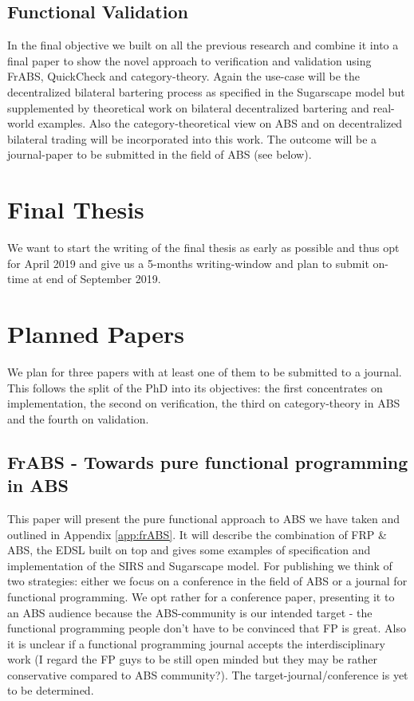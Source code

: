 \subsection{Functional Validation}
In the final objective we built on all the previous research and combine it into a final paper to show the novel approach to verification and validation using FrABS, QuickCheck and category-theory. Again the use-case will be the decentralized bilateral bartering process as specified in the Sugarscape model but supplemented by theoretical work on bilateral decentralized bartering and real-world examples. Also the category-theoretical view on ABS and on decentralized bilateral trading will be incorporated into this work. The outcome will be a journal-paper to be submitted in the field of ABS (see below).

\section{Final Thesis}
We want to start the writing of the final thesis as early as possible and thus opt for April 2019 and give us a 5-months writing-window and plan to submit on-time at end of September 2019.

\section{Planned Papers}
We plan for three papers with at least one of them to be submitted to a journal. This follows the split of the PhD into its objectives: the first concentrates on implementation, the second on verification, the third on category-theory in ABS and the fourth on validation. 

\subsection{FrABS - Towards pure functional programming in ABS}
This paper will present the pure functional approach to ABS we have taken and outlined in Appendix \ref{app:frABS}. It will describe the combination of FRP \& ABS, the EDSL built on top and gives some examples of specification and implementation of the SIRS and Sugarscape model.
For publishing we think of two strategies: either we focus on a conference in the field of ABS or a journal for functional programming. We opt rather for a conference paper, presenting it to an ABS audience because the ABS-community is our intended target - the functional programming people don't have to be convinced that FP is great. Also it is unclear if a functional programming journal accepts the interdisciplinary work (I regard the FP guys to be still open minded but they may be rather conservative compared to ABS community?). The target-journal/conference is yet to be determined.

